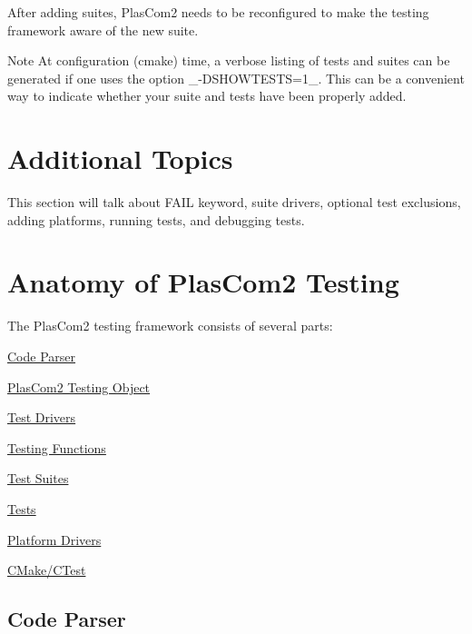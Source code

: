 After adding suites, Plas\+Com2 needs to be reconfigured to make the testing framework aware of the new suite.

\begin{DoxyNote}{Note}
At configuration (cmake) time, a verbose listing of tests and suites can be generated if one uses the option \+\_\+-\/\+D\+S\+H\+O\+W\+T\+E\+S\+TS=1\+\_\+. This can be a convenient way to indicate whether your suite and tests have been properly added.
\end{DoxyNote}
\hypertarget{testing_reference_additional}{}\section{Additional Topics}\label{testing_reference_additional}
This section will talk about F\+A\+IL keyword, suite drivers, optional test exclusions, adding platforms, running tests, and debugging tests.\hypertarget{testing_reference_anatomy}{}\section{Anatomy of Plas\+Com2 Testing}\label{testing_reference_anatomy}
The Plas\+Com2 testing framework consists of several parts\+:
\begin{DoxyItemize}
\item \hyperlink{testing_reference_parser}{Code Parser}
\item \hyperlink{testing_reference_object}{Plas\+Com2 Testing Object}
\item \hyperlink{testing_reference_drivers}{Test Drivers}
\item \hyperlink{testing_reference_functions}{Testing Functions}
\item \hyperlink{testing_reference_suites}{Test Suites}
\item \hyperlink{testing_reference_tests}{Tests}
\item \hyperlink{testing_reference_platforms}{Platform Drivers}
\item \hyperlink{testing_reference_cmake}{C\+Make/\+C\+Test}
\end{DoxyItemize}\hypertarget{testing_reference_parser}{}\subsection{Code Parser}\label{testing_reference_parser}

